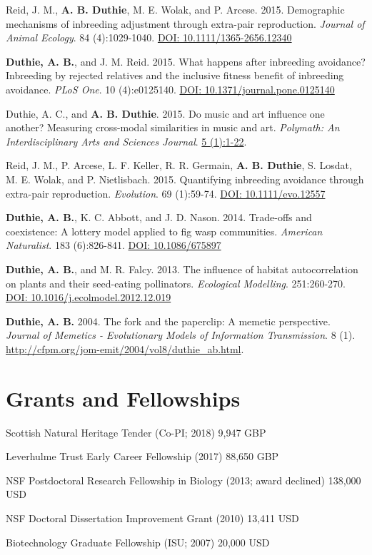 \documentclass[letterpaper]{article}
\renewenvironment{itemize}{
  \begin{list}{}{
    \setlength{\leftmargin}{1.5em}
  }
}{
  \end{list}
}
\begin{document}
\begin{etaremune}
\item Reid, J. M., {\bf A. B. Duthie}, M. E. Wolak, and P. Arcese. 2015. Demographic mechanisms of inbreeding adjustment through extra-pair reproduction. {\it Journal of Animal Ecology}. 84 (4):1029-1040. \href{http://onlinelibrary.wiley.com/doi/10.1111/1365-2656.12340/abstract}{DOI: 10.1111/1365-2656.12340}
\item {\bf Duthie, A. B.}, and J. M. Reid. 2015. What happens after inbreeding avoidance? Inbreeding by rejected relatives and the inclusive fitness benefit of inbreeding avoidance. {\it PLoS One}. 10 (4):e0125140. \href{http://journals.plos.org/plosone/article?id=10.1371/journal.pone.0125140}{DOI: 10.1371/journal.pone.0125140}
\item Duthie, A. C., and {\bf A. B. Duthie}. 2015. Do music and art influence one another? Measuring cross-modal similarities in music and art. {\it Polymath: An Interdisciplinary Arts and Sciences Journal}. \href{https://ojcs.siue.edu/ojs/index.php/polymath/article/view/3013}{5 (1):1-22}.
\item Reid, J. M., P. Arcese, L. F. Keller, R. R. Germain, {\bf A. B. Duthie}, S. Losdat, M. E. Wolak, and P. Nietlisbach. 2015. Quantifying inbreeding avoidance through extra-pair reproduction. {\it Evolution}. 69 (1):59-74. \href{http://onlinelibrary.wiley.com/doi/10.1111/evo.12557/abstract}{DOI: 10.1111/evo.12557}
\item {\bf Duthie, A. B.}, K. C. Abbott, and J. D. Nason. 2014. Trade-offs and coexistence: A lottery model applied to fig wasp communities. {\it American Naturalist}. 183 (6):826-841. \href{http://www.jstor.org/stable/10.1086/675897}{DOI: 10.1086/675897}
\item {\bf Duthie, A. B.}, and M. R. Falcy. 2013. The influence of habitat autocorrelation on plants and their seed-eating pollinators. {\it Ecological Modelling}. 251:260-270. \href{http://www.sciencedirect.com/science/article/pii/S0304380013000021}{DOI: 10.1016/j.ecolmodel.2012.12.019}
\item {\bf Duthie, A. B.} 2004. The fork and the paperclip: A memetic perspective. {\it Journal of Memetics - Evolutionary Models of Information Transmission}. 8 (1). \href{http://cfpm.org/jom-emit/2004/vol8/duthie_ab.html}{http://cfpm.org/jom-emit/2004/vol8/duthie\_ab.html}.
\end{etaremune}

\section*{Grants and Fellowships}
\begin{itemize}
\item Scottish Natural Heritage Tender (Co-PI; 2018) \hfill 9,947 GBP
\item Leverhulme Trust Early Career Fellowship (2017) \hfill 88,650 GBP
\item NSF Postdoctoral Research Fellowship in Biology (2013; award declined) \hfill 138,000 USD
\item NSF Doctoral Dissertation Improvement Grant (2010) \hfill 13,411 USD
\item Biotechnology Graduate Fellowship (ISU; 2007) \hfill 20,000 USD 
\end{itemize}
\end{document}
